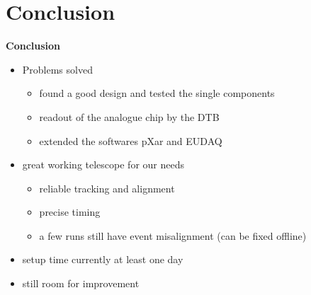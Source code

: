 \documentclass[9pt]{beamer}
\begin{document}
\section{Conclusion}
\begin{frame}
	\begin{alertblock}{
		\begin{center}
			\Large{\textbf{Conclusion}}
		\end{center}}
	\end{alertblock}
\end{frame}
\begin{frame}
	\begin{itemize}
		\setlength{\itemsep}{\fill}
		\item Problems solved
		\begin{itemize}
			\item found a good design and tested the single components
			\item readout of the analogue chip by the DTB 
			\item extended the softwares pXar and EUDAQ
		\end{itemize}
		\item great working telescope for our needs
		\begin{itemize}
			\item reliable tracking and alignment
			\item precise timing 
			\item a few runs still have event misalignment (can be fixed offline)
		\end{itemize}
		\item setup time currently at least one day
		\item still room for improvement
	\end{itemize}
\end{frame}
\end{document}
